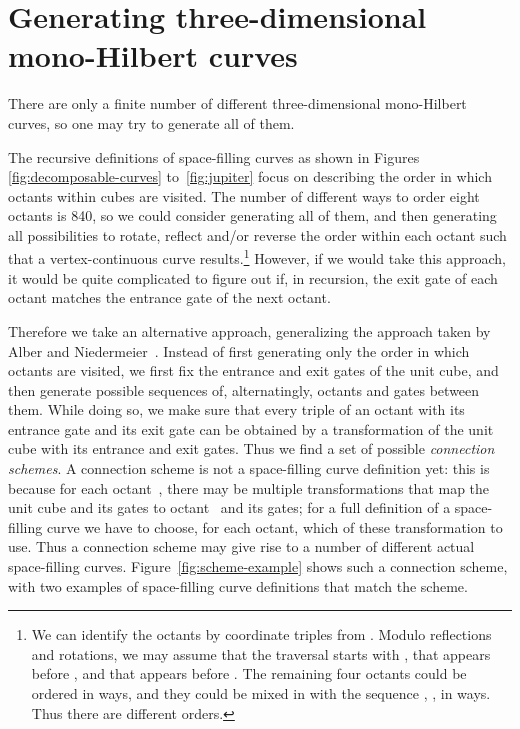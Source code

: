 \documentclass[11pt,a4paper]{article}
\begin{document}
\section{Generating three-dimensional mono-Hilbert curves}
\label{sec:generating}

There are only a finite number of different three-dimensional mono-Hilbert curves, so one may try to generate all of them.

The recursive definitions of space-filling curves as shown in Figures \ref{fig:decomposable-curves} to~\ref{fig:jupiter} focus on describing the order in which octants within cubes are visited. The number of different ways to order eight octants is 840, so we could consider generating all of them, and then generating all possibilities to rotate, reflect and/or reverse the order within each octant such that a vertex-continuous curve results.\footnote{We can identify the octants by coordinate triples from . Modulo reflections and rotations, we may assume that the traversal starts with , that  appears before , and that  appears before . The remaining four octants could be ordered in  ways, and they could be mixed in with the sequence , ,  in  ways. Thus there are  different orders.}
However, if we would take this approach, it would be quite complicated to figure out if, in recursion, the exit gate of each octant matches the entrance gate of the next octant.

Therefore we take an alternative approach, generalizing the approach taken by Alber and Niedermeier~\cite{Alber}. Instead of first generating only the order in which octants are visited, we first fix the entrance and exit gates of the unit cube, and then generate possible sequences of, alternatingly, octants and gates between them. While doing so, we make sure that every triple of an octant with its entrance gate and its exit gate can be obtained by a transformation of the unit cube with its entrance and exit gates. Thus we find a set of possible \emph{connection schemes}. A connection scheme is not a space-filling curve definition yet: this is because for each octant~, there may be multiple transformations that map the unit cube and its gates to octant~ and its gates; for a full definition of a space-filling curve we have to choose, for each octant, which of these transformation to use. Thus a connection scheme may give rise to a number of different actual space-filling curves. Figure~\ref{fig:scheme-example} shows such a connection scheme, with two examples of space-filling curve definitions that match the scheme.
\end{document}

